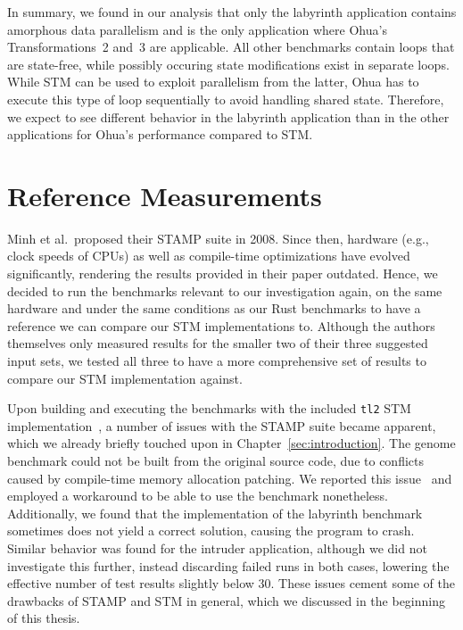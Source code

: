 In summary, we found in our analysis that only the labyrinth application contains amorphous data parallelism and is the only application where Ohua's Transformations~2 and~3 are applicable.
All other benchmarks contain loops that are state-free, while possibly occuring state modifications exist in separate loops.
While STM can be used to exploit parallelism from the latter, Ohua has to execute this type of loop sequentially to avoid handling shared state.
Therefore, we expect to see different behavior in the labyrinth application than in the other applications for Ohua's performance compared to STM.

\section{Reference Measurements}
\label{sec:experiments:reference}

Minh et al.\ proposed their STAMP suite in 2008.
Since then, hardware (e.g., clock speeds of CPUs) as well as compile-time optimizations have evolved significantly, rendering the results provided in their paper outdated.
Hence, we decided to run the benchmarks relevant to our investigation again, on the same hardware and under the same conditions as our Rust benchmarks to have a reference we can compare our STM implementations to.
Although the authors themselves only measured results for the smaller two of their three suggested input sets, we tested all three to have a more comprehensive set of results to compare our STM implementation against.

Upon building and executing the benchmarks with the included \texttt{tl2} STM implementation~\cite{minh2013stampcode}, a number of issues with the STAMP suite became apparent, which we already briefly touched upon in Chapter~\ref{sec:introduction}.
The genome benchmark could not be built from the original source code, due to conflicts caused by compile-time memory allocation patching.
We reported this issue~\cite{wittwer2020stampgenome} and employed a workaround to be able to use the benchmark nonetheless.
Additionally, we found that the implementation of the labyrinth benchmark sometimes does not yield a correct solution, causing the program to crash.
Similar behavior was found for the intruder application, although we did not investigate this further, instead discarding failed runs in both cases, lowering the effective number of test results slightly below 30.
These issues cement some of the drawbacks of STAMP and STM in general, which we discussed in the beginning of this thesis.

